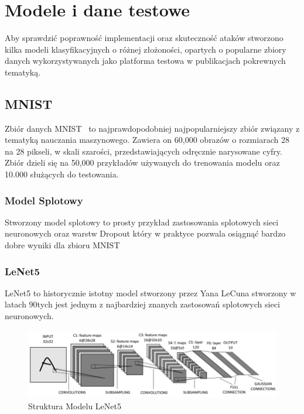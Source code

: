 \documentclass[
    left=2.5cm,         %
    right=2.5cm,        %
    top=2.5cm,          %
    bottom=3cm,         %
    bindingoffset=6mm,  %
    nohyphenation=false %
]{eiti/eiti-thesis}
\begin{document}
\newpage
\section{Modele i dane testowe}
Aby sprawdzić poprawność implementacji oraz skuteczność ataków stworzono
kilka modeli klasyfikacyjnych o różnej złożoności, opartych o popularne zbiory danych
wykorzystywanych jako platforma testowa w publikacjach pokrewnych tematyką.

    \subsection{MNIST}
    Zbiór danych MNIST~\cite{mnist} to najprawdopodobniej najpopularniejszy zbiór związany z
    tematyką nauczania maszynowego.
    Zawiera on 60,000 obrazów o rozmiarach 28 na 28 pikseli, w skali szarości, przedstawiających
    odręcznie narysowane cyfry. Zbiór dzieli się na 50,000 przykładów używanych do
    trenowania modelu oraz 10.000 służących do testowania.

        \subsubsection{Model Splotowy}
        Stworzony model splotowy to prosty przykład zastosowania splotowych sieci neuronowych oraz warstw Dropout
        który w praktyce pozwala osiągnąć bardzo dobre wyniki dla zbioru MNIST


        \subsubsection{LeNet5}
        LeNet5 to historycznie istotny model stworzony przez Yana LeCuna stworzony w latach 90tych
        jest jednym z najbardziej znanych zastosowań splotowych sieci neuronowych.
       \begin{figure}[H]
           \centring
            \includegraphics[width=\textwidth]{eiti/lenet5_overview.png}
            \caption{Struktura Modelu LeNet5\cite{LeNet5Diagram}}
       \end{figure}
\end{document}
